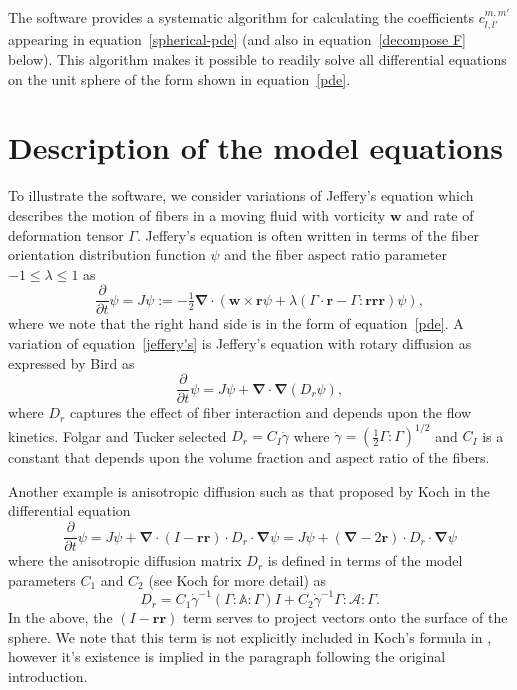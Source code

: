 \documentclass{amsart}
\newcommand\br{{\mathbf r}}
\newcommand\w{{\mathbf w}}
\newcommand\bnabla{{\boldsymbol \nabla}}
\begin{document}
The software provides a systematic algorithm for calculating the coefficients $c_{l,l'}^{m,m'}$ appearing in equation~\eqref{spherical-pde} (and also in equation~\eqref{decompose F} below). This algorithm makes it possible to readily solve all differential
equations on the unit sphere of the form shown in equation~\eqref{pde}.

\section{Description of the model equations}

To illustrate the software, we consider variations of Jeffery's equation \cite{jeffery:23} which describes the motion of fibers in a
moving fluid with vorticity $\w$ and rate of deformation tensor $\Gamma$. Jeffery's equation is
often written in terms of the fiber orientation distribution function $\psi$ and the fiber aspect ratio parameter $-1 \le \lambda\le1$ as
\begin{equation}
\label{jeffery's}
\frac\partial{\partial t}\psi = J \psi := -
\tfrac12\bnabla\cdot(\w \times \br \psi + \lambda(\Gamma\cdot\br -
\Gamma:\br\br\br) \psi) ,
\end{equation}
where we note that the right hand side is in the form of equation~\eqref{pde}. A variation of equation~\eqref{jeffery's} is Jeffery's equation with
rotary diffusion as expressed by Bird \cite{bird:87b} as
\begin{equation}
\label{jeffery's-folgar-tucker}
\frac\partial{\partial t}\psi = J \psi + \bnabla\cdot\bnabla(D_r
\psi) ,
\end{equation}
where $D_r$ captures the effect of fiber interaction and depends upon the flow kinetics. Folgar and Tucker \cite{folgar:84} selected $D_r = C_I \dot{\gamma}$ where $\dot{\gamma} =
\left(\frac12\Gamma:\Gamma\right)^{1/2}$ and $C_I$ is a constant that depends upon the volume fraction and aspect ratio of the
fibers.

Another example is anisotropic diffusion such as that proposed by Koch \cite{koch:95} in the
differential equation
\begin{equation}
\label{koch} \frac\partial{\partial t}\psi = J \psi +
\bnabla\cdot(I-\br\br)\cdot D_r\cdot\bnabla\psi = J \psi +
(\bnabla-2\br)\cdot D_r\cdot\bnabla\psi
\end{equation}
where the anisotropic diffusion matrix $D_r$ is defined in terms of the model parameters $C_1$ and $C_2$ (see Koch \cite{koch:95} for more detail) as
\begin{equation}
\label{kochDr}
D_r = C_1 {\dot\gamma}^{-1} (\Gamma:\mathbb A:\Gamma)I + C_2
{\dot\gamma}^{-1} \Gamma:\mathcal A:\Gamma .
\end{equation}
In the above, the $(I-\br\br)$ term serves to project vectors onto the surface of the sphere. We note that this term is not explicitly included in
Koch's formula in \cite{koch:95}, however it's existence is implied in the paragraph following the original introduction.
\end{document}
